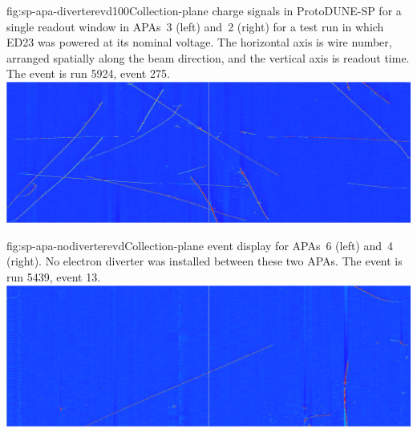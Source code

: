 \begin{dunefigure}{fig:sp-apa-diverterevd100}{Collection-plane charge signals in ProtoDUNE-SP for a single readout window in APAs~3 (left) and~2 (right) for a test run in which ED23 was powered at its nominal voltage.  The horizontal axis is wire number, arranged spatially along the beam direction, and the vertical axis is readout time.  The event is run 5924, event 275.}
    \includegraphics[width=\textwidth,trim=85mm 0mm 85mm 0mm,clip]{graphics/sp-apa-diverter100percent-R5924-E275-T1T5.png}
\end{dunefigure}

\begin{dunefigure}{fig:sp-apa-nodiverterevd}{Collection-plane event display for APAs~6 (left) and~4 (right). No electron diverter was installed between these two APAs.  The event is run 5439, event 13.}
    \includegraphics[width=\textwidth,trim=85mm 0mm 85mm 0mm,clip]{graphics/sp-apa-nodiverterevd.png}
\end{dunefigure}

